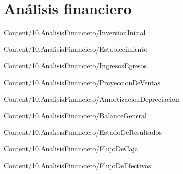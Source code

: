\section{Análisis financiero}

{Content/10.AnalisisFinanciero/InversionInicial}

{Content/10.AnalisisFinanciero/Establecimiento}

{Content/10.AnalisisFinanciero/IngresosEgresos}

{Content/10.AnalisisFinanciero/ProyeccionDeVentas}

{Content/10.AnalisisFinanciero/AmortizacionDepreciacion}

{Content/10.AnalisisFinanciero/BalanceGeneral}

{Content/10.AnalisisFinanciero/EstadoDeResultados}

{Content/10.AnalisisFinanciero/FlujoDeCaja}

{Content/10.AnalisisFinanciero/FlujoDeEfectivos}


